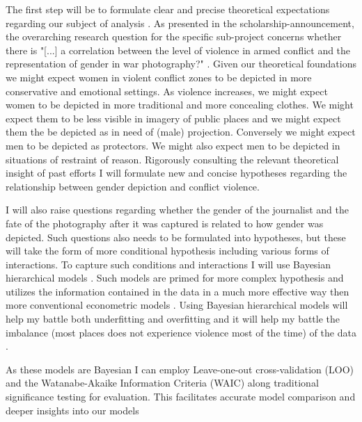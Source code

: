 \documentclass[a4paper]{article}
\begin{document}
The first step will be to formulate clear and precise theoretical expectations regarding our subject of analysis \cite[30-53]{Cederman_Gleditsch_Buhaug_2013}. As presented in the scholarship-announcement, the overarching research question for the specific sub-project concerns whether there is "[...] a correlation between the level of violence in armed conflict and the representation of gender in war photography?" \citep{bodies}. Given our theoretical foundations we might expect women in violent conflict zones to be depicted in more conservative and emotional settings. As violence increases, we might expect women to be depicted in more traditional and more concealing clothes. We might expect them to be less visible in imagery of public places and we might expect them the be depicted as in need of (male) projection. Conversely we might expect men to be depicted as protectors. We might also expect men to be depicted in situations of restraint of reason. 
Rigorously consulting the relevant theoretical insight of past efforts I will formulate new and concise hypotheses regarding the relationship between gender depiction and conflict violence.\par 

I will also raise questions regarding whether the gender of the journalist and the fate of the photography after it was captured is related to how gender was depicted. Such questions also needs to be formulated into hypotheses, but these will take the form of more conditional hypothesis including various forms of interactions. To capture such conditions and interactions I will use Bayesian hierarchical models \citep{Gelman_2006, Gelman_2013, Mcelreath_2018}. Such models are primed for more complex hypothesis and utilizes the information contained in the data in a much more effective way then more conventional econometric models \cite[355]{Mcelreath_2018}. Using Bayesian hierarchical models will help my battle both underfitting and overfitting and it will help my battle the imbalance (most places does not experience violence most of the time) of the data \cite[356-357]{Mcelreath_2018}. \par

As these models are Bayesian I can employ Leave-one-out cross-validation (LOO) and the Watanabe-Akaike Information Criteria (WAIC) along traditional significance testing for evaluation. This facilitates accurate model comparison and deeper insights into our models \cite[165-205]{Mcelreath_2018} \par
\end{document}
